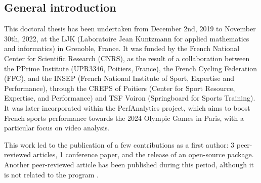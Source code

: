{}

\vspace*{-1cm}
\begin{flushright}
\section*{\fontsize{20pt}{20pt}\selectfont\textnormal{General introduction}}
\end{flushright}
\vspace{2cm}

\chead[\fancyplain{}{}]
      {\fancyplain{}{}}
\lfoot[\fancyplain{}{}]%
      {\fancyplain{}{}}
\cfoot[\fancyplain{}{\thepage}]
      {\fancyplain{}{\thepage}}
\rfoot[\fancyplain{}{}]%
     {\fancyplain{}{\scriptsize}}
     


This doctoral thesis has been undertaken from December 2nd, 2019 to November 30th, 2022, at the LJK (Laboratoire Jean Kuntzmann for applied mathematics and informatics) in Grenoble, France. It was funded by the French National Center for Scientific Research (CNRS), as the result of a collaboration between the PPrime Institute (UPR3346, Poitiers, France), the French Cycling Federation (FFC), and the INSEP (French National Institute of Sport, Expertise and Performance), through the CREPS of Poitiers (Center for Sport Resource, Expertise, and Performance) and TSF Voiron (Springboard for Sports Training). It was later incorporated within the PerfAnalytics project, which aims to boost French sports performance towards the 2024 Olympic Games in Paris, with a particular focus on video analysis.

This work led to the publication of a few contributions as a first author: 3 peer-reviewed articles, 1 conference paper, and the release of an open-source package. Another peer-reviewed article has been published during this period, although it is not related to the program \cite{Pagnon2022d}.

